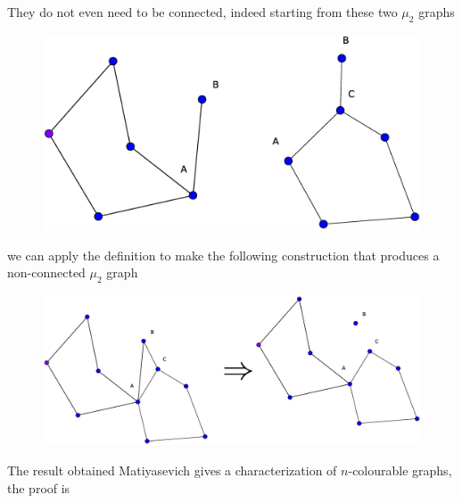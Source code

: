 \documentclass[a4paper,12pt,twoside]{book}
\begin{document}
\noindent They do not even need to be connected, indeed starting from these two $\mu_2$ graphs
\begin{figure}[h]
\centering\includegraphics[scale=0.25]{mu2-con1.eps}
\end{figure}

\noindent we can apply the definition to make the following construction that produces a non-connected $\mu_2$ graph 
\begin{figure}[h]
\centering\includegraphics[scale=0.25]{mu2-con2.eps}
\end{figure}

\newpage
The result obtained Matiyasevich gives a characterization of $n$-colourable graphs, the proof is 
\end{document}
